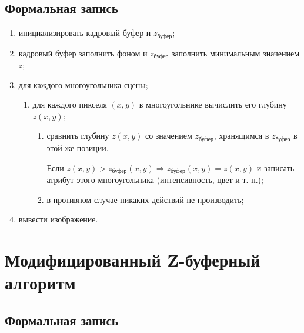 \subsection{Формальная запись}
\begin{enumerate}
	\item инициализировать кадровый буфер и $z_{\text{буфер}}$;
	\item кадровый буфер заполнить фоном и $z_{\text{буфер}}$ заполнить  минимальным значением $z$;
	\item для каждого многоугольника сцены;
    \begin{enumerate}[label=\arabic{enumi}.\arabic*]
		\item  для каждого пикселя $(x, y)$ в многоугольнике вычислить его глубину $z(x, y)$;
		 \begin{enumerate}
		\item  сравнить глубину $z(x, y)$ со значением  $z_{\text{буфер}}$, хранящимся в $z_{\text{буфер}}$ в этой же позиции. 
		
			Если  $z(x, y) > z_{\text{буфер}}(x, y) \Rightarrow z_{\text{буфер}}(x, y) = z(x, y) $ и записать атрибут этого многоугольника (интенсивность, цвет и т. п.);
	  
		\item в противном случае никаких действий не производить;
			\end{enumerate}
	\end{enumerate}
	
	\item вывести изображение.
\end{enumerate}


\clearpage


\clearpage



\section{Модифицированный Z-буферный алгоритм}

\subsection{Формальная запись}

